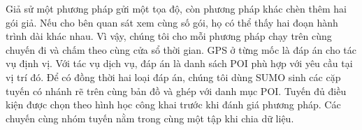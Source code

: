 Giả sử một phương pháp gửi một tọa độ, còn phương pháp khác chèn thêm hai gói
giả. Nếu cho bên quan sát xem cùng số gói, họ có thể thấy hai đoạn hành trình
dài khác nhau. Vì vậy, chúng tôi cho mỗi phương pháp chạy trên cùng chuyến
đi và chấm theo cùng cửa sổ thời gian. GPS ở từng mốc là đáp án cho tác vụ
định vị. Với tác vụ dịch vụ, đáp án là danh sách POI phù hợp với yêu cầu tại
vị trí đó. Để có đồng thời hai loại đáp án, chúng tôi dùng SUMO sinh các cặp
tuyến có nhánh rẽ trên cùng bản đồ và ghép với danh mục POI. Tuyến đủ điều
kiện được chọn theo hình học công khai trước khi đánh giá phương pháp.
Các chuyến cùng nhóm tuyến nằm trong cùng một tập khi chia dữ liệu.
